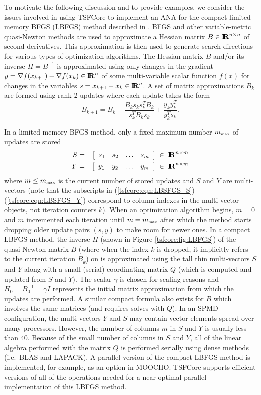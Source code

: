 To motivate the following discussion and to provide examples, we
consider the issues involved in using TSFCore to implement an ANA for
the compact limited-memory BFGS (LBFGS) method described in
{}\cite{ref:byrd_et_all_lbfgs_1994}.  BFGS and other variable-metric
quasi-Newton methods are used to approximate a Hessian matrix
$B\in\RE^{n \times n}$ of second derivatives.  This approximation is
then used to generate search directions for various types of
optimization algorithms.  The Hessian matrix $B$ and/or its inverse $H
= B^{-1}$ is approximated using only changes in the gradient $y =
\nabla f(x_{k+1}) - \nabla f(x_k) \in \RE^n$ of some multi-variable scalar
function $f(x)$ for changes in the variables $s = x_{k+1} - x_k \in
\RE^n$.  A set of matrix approximations $B_k$ are formed using rank-2
updates where each update takes the form
%
\begin{equation}
B_{k+1} = B_k - \frac{B_k s_k s_k^T B_k}{s_k^T B_k s_k} + \frac{y_k y_k^T}{y_k^T s_k}.
\end{equation}

In a limited-memory BFGS method, only a fixed maximum number
$m_{\tiny\mbox{max}}$ of updates are stored
%
\begin{eqnarray}
S & = & {\bmat{cccc} s_1 & s_2 & \ldots & s_{m} \emat} \label{tsfcore:eqn:LBSFGS_S} \; \in \; \RE^{n \times m}\\
Y & = & {\bmat{cccc} y_1 & y_2 & \ldots & y_{m} \emat} \label{tsfcore:eqn:LBSFGS_Y} \; \in \; \RE^{n \times m}
\end{eqnarray}
%
where $m \le m_{\tiny\mbox{max}}$ is the current number of stored
updates and $S$ and $Y$ are multi-vectors (note that the subscripts in
(\ref{tsfcore:eqn:LBSFGS_S})--(\ref{tsfcore:eqn:LBSFGS_Y}) correspond
to column indexes in the multi-vector objects, not iteration counters
$k$).  When an optimization algorithm begins, $m=0$ and $m$
incremented each iteration until $m = m_{\tiny\mbox{max}}$ after which
the method starts dropping older update pairs $(s,y)$ to make room for
newer ones.  In a compact LBFGS method, the inverse $H$ (shown in
Figure {}\ref{tsfcore:fig:LBFGS}) of the quasi-Newton matrix $B$
(where when the index $k$ is dropped, it implicitly refers to the
current iteration $B_k$) on is approximated using the tall thin
multi-vectors $S$ and $Y$ along with a small (serial) coordinating
matrix $Q$ (which is computed and updated from $S$ and $Y$).  The
scalar $\gamma$ is chosen for scaling reasons and $H_0 = B_0^{-1} =
\gamma I$ represents the initial matrix approximation from which the
updates are performed.  A similar compact formula also exists for $B$
which involves the same matrices (and requires solves with $Q$).  In
an SPMD configuration, the multi-vectors $Y$ and $S$ may contain
vector elements spread over many processors.  However, the number of
columns $m$ in $S$ and $Y$ is usually less than $40$.  Because of the
small number of columns in $S$ and $Y$, all of the linear algebra
performed with the matrix $Q$ is performed serially using dense
methods (i.e.~BLAS and LAPACK).  A parallel version of the compact
LBFGS method is implemented, for example, as an option in MOOCHO.
TSFCore supports efficient versions of all of the operations needed
for a near-optimal parallel implementation of this LBFGS method.

